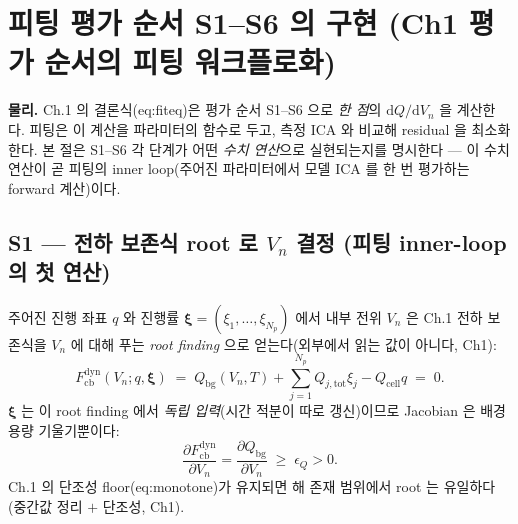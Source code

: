 \documentclass[11pt,a4paper]{article}
\newcommand{\dd}{\mathrm{d}}
\newcommand{\bg}{\mathrm{bg}}
\newcommand{\cell}{\mathrm{cell}}
\newcommand{\tot}{\mathrm{tot}}
\newcommand{\cb}{\mathrm{cb}}
\newcommand{\dyn}{\mathrm{dyn}}
\begin{document}
\section{피팅 평가 순서 S1--S6 의 구현 (Ch1 평가 순서의 피팅 워크플로화)}\label{sec:ch6_S}
\textbf{물리.} Ch.1 의 결론식(eq:fiteq)은 평가 순서 S1--S6 으로 \emph{한 점}의 $\dd Q/\dd V_n$ 을 계산한다. 피팅은
이 계산을 파라미터의 함수로 두고, 측정 ICA 와 비교해 residual 을 최소화한다. 본 절은 S1--S6 각 단계가 어떤
\emph{수치 연산}으로 실현되는지를 명시한다 — 이 수치 연산이 곧 피팅의 inner loop(주어진 파라미터에서 모델
ICA 를 한 번 평가하는 forward 계산)이다.

\subsection{S1 — 전하 보존식 root 로 $V_n$ 결정 (피팅 inner-loop 의 첫 연산)}\label{sec:ch6_S1}
주어진 진행 좌표 $q$ 와 진행률 $\bm\xi=(\xi_1,\dots,\xi_{N_p})$ 에서 내부 전위 $V_n$ 은 Ch.1 전하 보존식을
$V_n$ 에 대해 푸는 \emph{root finding} 으로 얻는다(외부에서 읽는 값이 아니다, Ch1):
\begin{equation}
F_\cb^\dyn(V_n;q,\bm\xi)\;=\;Q_\bg(V_n,T)+\sum_{j=1}^{N_p}Q_{j,\tot}\xi_j-Q_\cell q\;=\;0.
\label{eq:ch6_dyn_root}
\end{equation}
$\bm\xi$ 는 이 root finding 에서 \emph{독립 입력}(시간 적분이 따로 갱신)이므로 Jacobian 은 배경 용량 기울기뿐이다:
\begin{equation}
\frac{\partial F_\cb^\dyn}{\partial V_n}=\frac{\partial Q_\bg}{\partial V_n}\;\ge\;\epsilon_Q>0.
\label{eq:ch6_dyn_deriv}
\end{equation}
Ch.1 의 단조성 floor(eq:monotone)가 유지되면 해 존재 범위에서 root 는 유일하다(중간값 정리 $+$ 단조성, Ch1).
\end{document}
